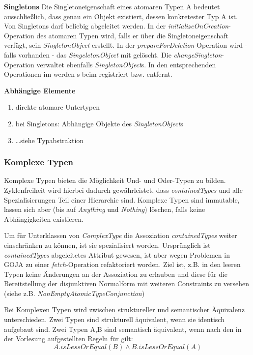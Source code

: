 \textbf{Singletons} \newline
Die Singletoneigenschaft eines atomaren Typen A bedeutet ausschließlich, dass genau ein Objekt existiert, dessen konkretester Typ A ist.
Von Singletons darf beliebig abgeleitet werden. 
In der \emph{initializeOnCreation}-Operation des atomaren Typen wird, falls er über die Singletoneigenschaft verfügt, 
sein \emph{SingletonObject} erstellt. In der \emph{prepareForDeletion}-Operation wird - falls vorhanden - das \emph{SingeletonObject}
mit gelöscht. Die \emph{changeSingleton}-Operation verwaltet ebenfalls \emph{SingletonObject}s. In den entsprechenden Operationen im 
 werden s beim  registriert bzw. entfernt.
 
\textbf{Abhängige Elemente}
\begin{enumerate}
  		\item direkte atomare Untertypen
  		\item bei Singletons: Abhängige Objekte des \emph{SingletonObject}s
  		\item \ldots siehe Typabstraktion
\end{enumerate}

\subsubsection{Komplexe Typen}

Komplexe Typen bieten die Möglichkeit Und- und Oder-Typen zu bilden. Zyklenfreiheit wird hierbei dadurch gewährleistet, 
dass \emph{containedTypes} und alle Spezialisierungen Teil einer Hierarchie sind. Komplexe Typen sind immutable,
lassen sich aber (bis auf \emph{Anything} und \emph{Nothing}) löschen, falls keine Abhängigkeiten existieren.


Um für Unterklassen von \emph{ComplexType} die Assoziation \emph{containedTypes} weiter einschränken zu 
können, ist sie spezialisiert worden. Ursprünglich ist \emph{containedTypes} abgeleitetes Attribut gewesen,
ist aber wegen Problemen in GOJA zu einer \emph{fetch}-Operation refaktoriert worden. 
Ziel ist, z.B. in den leeren Typen keine Änderungen an der Assoziation zu erlauben und diese für die Bereitstellung 
der disjunktiven Normalform mit weiteren Constraints zu versehen (siehe z.B. \emph{NonEmptyAtomicTypeConjunction}) 

Bei Komplexen Typen wird zwischen struktureller und semantischer Äquivalenz unterschieden. Zwei Typen sind strukturell 
äquivalent, wenn sie identisch aufgebaut sind. Zwei Typen A,B sind semantisch äquivalent, wenn nach den in der Vorlesung 
aufgestellten Regeln für  gilt: 
\[A.isLessOrEqual(B) \land B.isLessOrEqual(A) \]

